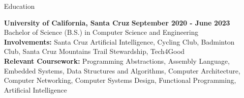 \documentclass{resume}
\begin{document}
\begin{rSection}{\large Education}

{\bf University of California, Santa Cruz} \hfill {\bf{September 2020 - June 2023}}
\\ Bachelor of Science (B.S.) in Computer Science and Engineering\hfill %
\\ \textbf{Involvements:}  Santa Cruz Artificial Intelligence, Cycling Club, Badminton Club, Santa Cruz Mountains Trail Stewardship, Tech4Good
\\ \textbf{Relevant Coursework:} Programming Abstractions, Assembly Language, Embedded Systems, Data Structures and Algorithms, Computer Architecture, Computer Networking, Computer Systems Design, Functional Programming, Artificial Intelligence

\end{rSection}
\end{document}
